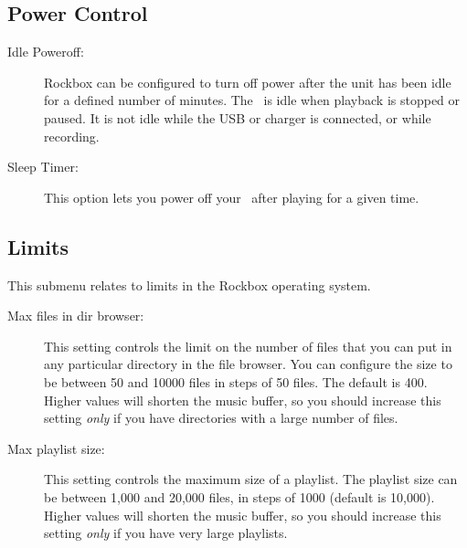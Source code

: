 \subsection{Power Control}
  \begin{description}
    \item [\label{ref:idlepoweroff}Idle Poweroff: ]Rockbox can be configured
    to turn off power after the unit has been idle for a defined number of
    minutes. The \dap\ is idle when playback is stopped or paused. It is not
    idle while the USB or charger is connected, or while recording.

    \item [Sleep Timer: ]This option lets you power off your \dap\ after
    playing for a given time.
  \end{description}

\subsection{Limits}
This submenu relates to limits in the Rockbox operating system.
  \begin{description}
    \item [Max files in dir browser: ]This setting controls the limit on 
    the number of files that you can put in any particular directory in the
    file browser. You can configure the size to be between 50 and 10000 files
    in steps of 50 files. The default is 400. Higher values will shorten the
    music buffer, so you should increase this setting \emph{only} if you have
    directories with a large number of files.

    \item [Max playlist size: ]This setting controls the maximum size of 
    a playlist. The playlist size can be between 1,000 and 20,000 files,
    in steps of 1000 (default is 10,000). Higher values will shorten the
    music buffer, so you should increase this setting \emph{only} if you
    have very large playlists.
  \end{description}
  
